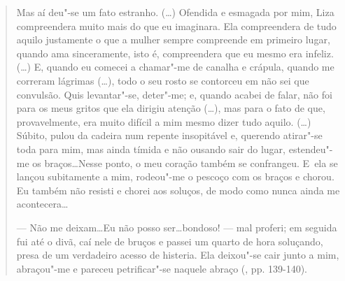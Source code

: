 \begin{quote}
Mas aí deu"-se um fato estranho. (\ldots) Ofendida e esmagada por mim, Liza
compreendera muito mais do que eu imaginara. Ela compreendera de tudo
aquilo justamente o que a mulher sempre compreende em primeiro lugar,
quando ama sinceramente, isto é, compreendera que eu mesmo era infeliz.
(\ldots) E, quando eu comecei a chamar"-me de canalha e crápula, quando me
correram lágrimas (\ldots), todo o seu rosto se contorceu em não sei que
convulsão. Quis levantar"-se, deter"-me; e, quando acabei de falar, não
foi para os meus gritos que ela dirigiu atenção (\ldots), mas para o fato
de que, provavelmente, era muito difícil a mim mesmo dizer tudo aquilo.
(\ldots) Súbito, pulou da cadeira num repente insopitável e, querendo
atirar"-se toda para mim, mas ainda tímida e não ousando sair do lugar,
estendeu"-me os braços\ldots Nesse ponto, o meu coração também se
confrangeu. E~ela se lançou subitamente a mim, rodeou"-me o pescoço com
os braços e chorou. Eu também não resisti e chorei aos soluços, de modo
como nunca ainda me acontecera\ldots

\noindent --- Não me deixam\ldots Eu não posso ser\ldots bondoso! --- mal proferi; em
seguida fui até o divã, caí nele de bruços e passei um quarto de hora
soluçando, presa de um verdadeiro acesso de histeria. Ela deixou"-se cair
junto a mim, abraçou"-me e pareceu petrificar"-se naquele abraço (,
pp. 139-140).
\end{quote}

